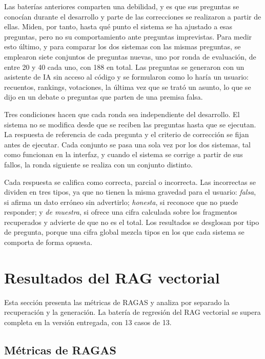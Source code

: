\documentclass[11pt, a4paper]{report}
\begin{document}
	Las baterías anteriores comparten una debilidad, y es que sus preguntas se conocían durante el desarrollo y parte de las correcciones se realizaron a partir de
	ellas. Miden, por tanto, hasta qué punto el sistema se ha ajustado a esas preguntas, pero no su comportamiento ante preguntas imprevistas. Para medir esto
	último, y para comparar los dos sistemas con las mismas preguntas, se
	emplearon siete conjuntos de preguntas nuevas, uno por ronda de evaluación,
	de entre 20 y 40 cada uno, con
	188 en total. Las preguntas se generaron con un asistente de IA sin acceso al
	código y se formularon como lo haría un usuario: recuentos, rankings,
	votaciones, la última vez que se trató un asunto, lo que se dijo en un debate
	o preguntas que parten de una premisa falsa.

	Tres condiciones hacen que cada ronda sea independiente del desarrollo. El
	sistema no se modifica desde que se reciben las preguntas hasta que se
	ejecutan. La respuesta de referencia de cada pregunta y el criterio de
	corrección se fijan antes de ejecutar. Cada conjunto se pasa una sola vez por
	los dos sistemas, tal como funcionan en la interfaz, y cuando el sistema se
	corrige a partir de sus fallos, la ronda siguiente se realiza con un conjunto
	distinto.

	Cada respuesta se califica como correcta, parcial o incorrecta. Las
	incorrectas se dividen en tres tipos, ya que no tienen la misma gravedad para
	el usuario: \textit{falsa}, si afirma un dato erróneo sin advertirlo;
	\textit{honesta}, si reconoce que no puede responder; y \textit{de muestra},
	si ofrece una cifra calculada sobre los fragmentos recuperados y advierte de
	que no es el total. Los resultados se desglosan por tipo de pregunta, porque
	una cifra global mezcla tipos en los que cada sistema se comporta de forma
	opuesta.

	\section{Resultados del RAG vectorial}

	Esta sección presenta las métricas de RAGAS y analiza por separado la
	recuperación y la generación. La batería de regresión del RAG vectorial se
	supera completa en la versión entregada, con 13 casos de 13.

	\subsection{Métricas de RAGAS}
\end{document}
